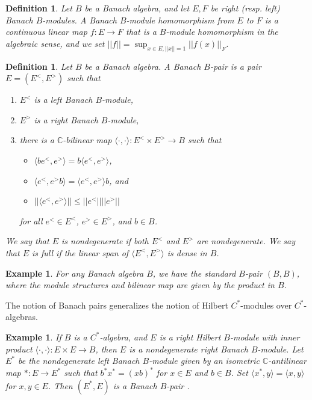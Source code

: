 \documentclass[a4,11pt]{amsart}
\newtheorem{ex}[thm]{Example}
\newtheorem{defn}[thm]{Definition}
\theoremstyle{remark}
\begin{document}
\begin{defn}
Let $B$ be a Banach algebra, and let $E,F$ be right (resp. left) Banach $B$-modules.
A Banach $B$-module homomorphism from $E$ to $F$ is a continuous linear map $f:E\rightarrow F$ that is a $B$-module homomorphism in the algebraic sense, and we set $||f||=\sup_{x\in E,||x||=1}||f(x)||_F$.
\end{defn}

\begin{defn}
Let $B$ be a Banach algebra. A Banach $B$-pair is a pair $E=(E^<,E^>)$ such that
\begin{enumerate}
\item $E^<$ is a left Banach $B$-module,
\item $E^>$ is a right Banach $B$-module,
\item there is a $\mathbb{C}$-bilinear map $\langle\cdot,\cdot\rangle:E^<\times E^>\rightarrow B$ such that 
\begin{itemize}
\item $\langle be^<,e^> \rangle=b\langle e^<,e^> \rangle$,
\item $\langle e^<,e^>b \rangle=\langle e^<,e^> \rangle b$, and
\item $||\langle e^<,e^> \rangle||\leq||e^<|| ||e^>||$
\end{itemize}
for all $e^<\in E^<$, $e^>\in E^>$, and $b\in B$.
\end{enumerate}
We say that $E$ is nondegenerate if both $E^<$ and $E^>$ are nondegenerate. We say that $E$ is full if the linear span of $\langle E^<,E^> \rangle$ is dense in $B$.
\end{defn}

\begin{ex}
For any Banach algebra $B$, we have the standard $B$-pair $(B,B)$, where the module structures and bilinear map are given by the product in $B$.
\end{ex}

The notion of Banach pairs generalizes the notion of Hilbert $C^*$-modules over $C^*$-algebras.

\begin{ex} \label{ex:Cstar}
If $B$ is a $C^*$-algebra, and $E$ is a right Hilbert $B$-module with inner product $\langle\cdot,\cdot\rangle:E\times E\rightarrow B$, then $E$ is a nondegenerate right Banach $B$-module.
Let $E^*$ be the nondegenerate left Banach $B$-module given by an isometric $\mathbb{C}$-antilinear map $*:E\rightarrow E^*$ such that $b^*x^*=(xb)^*$ for $x\in E$ and $b\in B$.
Set $\langle x^*,y\rangle=\langle x,y \rangle$ for $x,y\in E$.
Then $(E^*,E)$ is a Banach $B$-pair \cite[Proposition 1.14]{Laf02}.
\end{ex}
\end{document}
